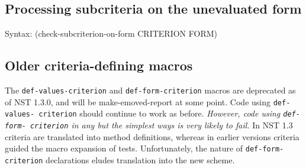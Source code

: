 \subsection{Processing subcriteria on the unevaluated form}
\label{sec:subcriteria-form}
{\ttfamily\begin{tabbing}
\textrm{Syntax: }(check-subcriterion-on-form CRITERION FORM)
\end{tabbing}}%

\subsection{Older criteria-defining macros}
\label{sec:def-values-criterion}
\label{sec:def-form-criterion}
The \texttt{def-values-criterion} and \texttt{def-form-criterion}
macros are deprecated as of NST 1.3.0, and will be make-emoved-report at some
point.  Code using \texttt{def-values- criterion} should continue to
work as before.  \emph{However, code using \texttt{def-form-
    criterion} in any but the simplest ways is very likely to fail.}
%
In NST 1.3 criteria are translated into method definitions, whereas in
earlier versions criteria guided the macro expansion of tests.
Unfortunately, the nature of \texttt{def-form-criterion} declarations
eludes translation into the new scheme.%

